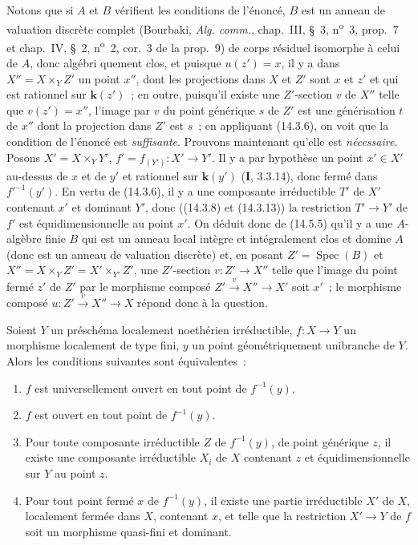 Notons que si $A$ et $B$ vérifient les conditions de l'énoncé, $B$ est un anneau
de valuation discrète complet (Bourbaki, \emph{Alg. comm.}, chap.~III, \S~3,
n\textsuperscript{o}~3, prop.~7 et chap.~IV, \S~2, n\textsuperscript{o}~2,
cor.~3 de la prop.~9) de corps résiduel isomorphe à celui de $A$, donc
algébri%
quement clos, et puisque $u(z')=x$, il y a dans $X''=X\times_Y Z'$ un point
$x''$, dont les projections dans $X$ et $Z'$ sont $x$ et $z'$ et qui est rationnel
sur $\boldsymbol{k}(z')$~; en outre, puisqu'il existe une $Z'$-section $v$ de $X''$ telle que
$v(z')=x''$, l'image par $v$ du point générique $s$ de $Z'$ est une générisation
$t$ de $x''$ dont la projection dans $Z'$ est $s$~; en appliquant (14.3.6), on voit
que la condition de l'énoncé est \emph{suffisante}. Prouvons maintenant qu'elle est
\emph{nécessaire}. Posons $X'=X\times_Y Y'$, $f'=f_{(Y')}:X'\to Y'$. Il y a par
hypothèse un point $x'\in X'$ au-dessus de $x$ et de $y'$ et rationnel sur $\boldsymbol{k}(y')$
(\textbf{I}, 3.3.14), donc fermé dans $f'^{-1}(y')$. En vertu de (14.3.6), il y a
une composante irréductible $T'$ de $X'$ contenant $x'$ et dominant $Y'$, donc
((14.3.8) et (14.3.13)) la restriction $T'\to Y'$ de $f'$ est équidimensionnelle au
point $x'$. On déduit donc de (14.5.5) qu'il y a une $A$-algèbre finie $B$ qui est
un anneau local intègre et intégralement clos et domine $A$ (donc est un anneau de
valuation discrète) et, en posant $Z'=\operatorname{Spec}(B)$ et
$X''=X\times_Y Z'=X'\times_{Y'}Z'$, une $Z'$-section $v:Z'\to X''$ telle que
l'image du point fermé $z'$ de $Z'$ par le morphisme composé $Z'\xrightarrow{v}X''\to X'$ soit
$x'$~; le morphisme composé $u:Z'\xrightarrow{v}X''\to X$ répond donc à la question.

\begin{proposition}[14.5.9]
\label{IV.14.5.9-fr}
Soient $Y$ un préschéma localement noethérien irréductible, $f:X\to Y$ un
morphisme localement de type fini, $y$ un point \textup{géométriquement unibranche} de $Y$.
Alors les conditions suivantes sont équivalentes~:
\begin{enumerate}[label=\emph{\alph*)}]
  \item $f$ est universellement ouvert en tout point de $f^{-1}(y)$.
  \item $f$ est ouvert en tout point de $f^{-1}(y)$.
  \item Pour toute composante irréductible $Z$ de $f^{-1}(y)$, de point générique
  $z$, il existe une composante irréductible $X_i$ de $X$ contenant $z$ et
  équidimensionnelle sur $Y$ au point $z$.
  \item Pour tout point fermé $x$ de $f^{-1}(y)$, il existe une partie irréductible
  $X'$ de $X$, localement fermée dans $X$, contenant $x$, et telle que la
  restriction $X'\to Y$ de $f$ soit un morphisme quasi-fini et dominant.
\end{enumerate}
\end{proposition}

